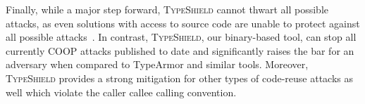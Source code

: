 Finally, while a major step forward, \textsc{TypeShield} cannot thwart all possible attacks, as even solutions with access to source 
code are unable to protect against all possible attacks~\cite{carlini:bending}. In contrast, \textsc{TypeShield}, our binary-based tool, 
can stop all currently COOP attacks published to date and significantly raises the bar for an adversary when compared to
TypeArmor and similar tools. Moreover, \textsc{TypeShield} provides a strong mitigation for other types of code-reuse attacks as well
which violate the caller callee calling convention.



